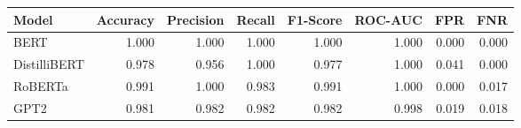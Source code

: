 \begin{tabular}{|l||r|r|r|r|r|r|r|}
\toprule
Model & \textbf{Accuracy} & \textbf{Precision} & Recall & \textbf{F1-Score} & \textbf{ROC-AUC} & \textbf{FPR} & FNR \\
\midrule \midrule
BERT & 1.000 & 1.000 & 1.000 & 1.000 & 1.000 & 0.000 & 0.000 \\
DistilliBERT & 0.978 & 0.956 & 1.000 & 0.977 & 1.000 & 0.041 & 0.000 \\
RoBERTa & 0.991 & 1.000 & 0.983 & 0.991 & 1.000 & 0.000 & 0.017 \\
GPT2 & 0.981 & 0.982 & 0.982 & 0.982 & 0.998 & 0.019 & 0.018 \\
\bottomrule
\end{tabular}
